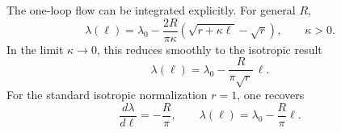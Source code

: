 \documentclass[aps,prx,preprint,amsmath,amssymb]{revtex4-2}
\begin{document}
The one-loop flow can be integrated explicitly.  For general \(R\),
\begin{equation}\label{eq:lambda-flow-integrated}
\lambda(\ell)
=
\lambda_0
-\frac{2R}{\pi\kappa}
\left(
\sqrt{r+\kappa\ell}-\sqrt{r}
\right),
\qquad
\kappa>0.
\end{equation}
In the limit \(\kappa\to 0\), this reduces smoothly to the isotropic result
\begin{equation}\label{eq:lambda-flow-nolog}
\lambda(\ell)
=
\lambda_0-\frac{R}{\pi\sqrt{r}}\,\ell.
\end{equation}
For the standard isotropic normalization \(r=1\), one recovers
\begin{equation}
\frac{d\lambda}{d\ell}=-\frac{R}{\pi},
\qquad
\lambda(\ell)=\lambda_0-\frac{R}{\pi}\ell.
\end{equation}
\end{document}
